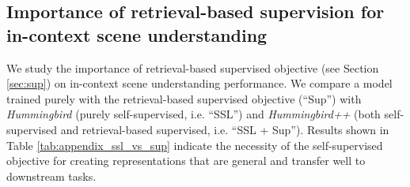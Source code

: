\documentclass{article}
\newcommand{\ours}{\textit{Hummingbird} }
\newcommand{\oursup}{\textit{Hummingbird}\textit{++} }
\begin{document}
\subsection{Importance of retrieval-based supervision for in-context scene understanding}
\label{sec:app-supervision}

We study the importance of retrieval-based supervised objective (see Section \ref{sec:sup}) on in-context scene understanding performance. We compare a model trained purely with the retrieval-based supervised objective (``Sup'') with \ours (purely self-supervised, i.e. ``SSL'') and \oursup (both self-supervised and retrieval-based supervised, i.e. ``SSL + Sup''). Results shown in Table \ref{tab:appendix_ssl_vs_sup} indicate the necessity of the self-supervised objective for creating representations that are general and transfer well to downstream tasks.




\null
\vfill











\end{document}
